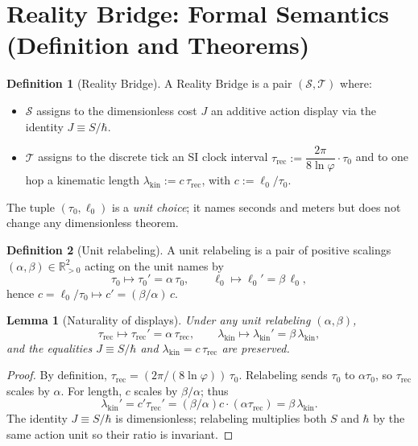 \documentclass[11pt]{article}
\theoremstyle{plain}
\newtheorem{lemma}{Lemma}
\theoremstyle{definition}
\newtheorem{definition}{Definition}
\theoremstyle{remark}
\begin{document}
\section{Reality Bridge: Formal Semantics (Definition and Theorems)}

\begin{definition}[Reality Bridge]
A Reality Bridge is a pair \((\mathcal{S},\mathcal{T})\) where:
\begin{itemize}
  \item \(\mathcal{S}\) assigns to the dimensionless cost \(J\) an additive action display via the identity \(J \equiv S/\hbar\).
  \item \(\mathcal{T}\) assigns to the discrete tick an SI clock interval \(\tau_{\mathrm{rec}} := \dfrac{2\pi}{8\ln\varphi}\cdot \tau_{0}\) and to one hop a kinematic length \(\lambda_{\mathrm{kin}} := c\,\tau_{\mathrm{rec}}\), with \(c:=\ell_{0}/\tau_{0}\).
\end{itemize}
The tuple \((\tau_{0},\ell_{0})\) is a \emph{unit choice}; it names seconds and meters but does not change any dimensionless theorem.
\end{definition}

\begin{definition}[Unit relabeling]
A unit relabeling is a pair of positive scalings \((\alpha,\beta)\in\mathbb{R}_{>0}^2\) acting on the unit names by
\[
\tau_{0}\mapsto \tau_{0}'=\alpha\,\tau_{0},\qquad
\ell_{0}\mapsto \ell_{0}'=\beta\,\ell_{0},
\]
hence \(c=\ell_{0}/\tau_{0}\mapsto c'=(\beta/\alpha)\,c\).
\end{definition}

\begin{lemma}[Naturality of displays]
Under any unit relabeling \((\alpha,\beta)\),
\[
\tau_{\mathrm{rec}}\mapsto \tau_{\mathrm{rec}}'=\alpha\,\tau_{\mathrm{rec}},\qquad
\lambda_{\mathrm{kin}}\mapsto \lambda_{\mathrm{kin}}'=\beta\,\lambda_{\mathrm{kin}},
\]
and the equalities \(J\equiv S/\hbar\) and \(\lambda_{\mathrm{kin}}=c\,\tau_{\mathrm{rec}}\) are preserved.
\end{lemma}

\begin{proof}
By definition, \(\tau_{\mathrm{rec}}=(2\pi/(8\ln\varphi))\,\tau_{0}\). Relabeling sends \(\tau_{0}\) to \(\alpha\tau_{0}\), so \(\tau_{\mathrm{rec}}\) scales by \(\alpha\). For length, \(c\) scales by \(\beta/\alpha\); thus
\[
\lambda_{\mathrm{kin}}'=c'\tau_{\mathrm{rec}}'=(\beta/\alpha)c\cdot(\alpha\tau_{\mathrm{rec}})=\beta\,\lambda_{\mathrm{kin}}.
\]
The identity \(J\equiv S/\hbar\) is dimensionless; relabeling multiplies both \(S\) and \(\hbar\) by the same action unit so their ratio is invariant.
\end{proof}
\end{document}
